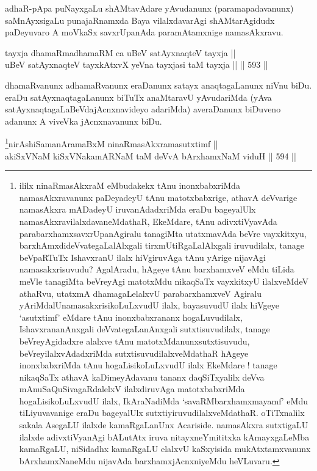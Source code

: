 \begin{artha}
adhaR-pApa puNayxgaLu shAMtavAdare yAvudanunx
(paramapadavanunx) saMnAyxsigaLu punajaRnamxda Baya vilalxdavarAgi
shAMtarAgidudx paDeyuvaro A moVkaSx savxrUpanAda paramAtamxnige
namasAkxravu.
\end{artha}


\begin{shl}
tayxja dhamaRmadhamaRM ca uBeV satAyxnaqteV tayxja || \\
uBeV satAyxnaqteV tayxkAtxvX yeVna tayxjasi taM tayxja ||  \hfill || 593 ||  
\end{shl}

\begin{artha}
dhamaRvanunx adhamaRvanunx eraDanunx satayx anaqtagaLanunx niVnu
biDu. eraDu satAyxnaqtagaLanunx biTuTx anaMtaravU yAvudariMda (yAva
satAyxnaqtagaLaBeVdajAcnxnavideyo adariMda) averaDanunx biDuveno
adanunx A viveVka jAcnxnavanunx biDu.
\end{artha}


\begin{shl}
\footnote{ililx ninaRmasAkxraM eMbudakekx tAnu inonxbabxriMda namasAkxravanunx paDeyadeyU tAnu matotxbabxrige, athavA deVvarige namasAkxra mADadeyU iruvanAdadxriMda eraDu bageyalUlx namasAkxravilalxdavaneMdathaR, EkeMdare, tAnu adivxtiVyavAda parabarxhamxsavxrUpanAgiralu tanagiMta utatxmavAda beVre vayxkitxyu, barxhAmxdideVvategaLalAlxgali tirxmUtiRgaLalAlxgali iruvudilalx, tanage beVpaRTuTx IshavxranU ilalx hiVgiruvAga tAnu yArige nijavAgi namasakxrisuvudu? AgalAradu, hAgeye tAnu barxhamxveV eMdu tiLida meVle tanagiMta beVreyAgi matotxMdu nikaqSaTx vayxkitxyU ilalxveMdeV athaRvu, utatxmA dhamagaLelalxvU parabarxhamxveV Agiralu yAriMdalU\break namasakxrisikoLuLxvudU ilalx, bayasuvudU ilalx hiVgeye `asutxtimf' eMdare tAnu inonxbabxrananx hogaLuvudilalx, IshavxrananAnxgali deVvategaLanAnxgali sutxtisuvudilalx, tanage beVreyAgidadxre alalxve tAnu matotxMdanunxsutxtisuvudu, beVreyilalxvAdadxriMda sutxtisuvudilalxveMdathaR hAgeye inonxbabxriMda tAnu hogaLisikoLuLxvudU ilalx EkeMdare ! tanage nikaqSaTx athavA kaDimeyAdavanu tananx daqSiTxyalilx deVva mAnuSaQuSivagaRdalelxV ilalxdiruvAga matotxbabxriMda hogaLisikoLuLxvudU ilalx, IkAraNadiMda `savaRMbarxhamxmayamf' eMdu tiLiyuvavanige eraDu bageyalUlx sutxtiyiruvudilalxveMdathaR. oTiTxnalilx sakala AsegaLU ilalxde kamaRgaLanUnx Acariside. namasAkxra sutxtigaLU ilalxde adivxtiVyanAgi bALutAtx iruva nitayxneYmititxka kAmayxgaLeMba kamaRgaLU, niSidadhx kamaRgaLU elalxvU kaSxyisida mukAtxtamxvanunx bArxhamxNaneMdu nijavAda barxhamxjAcnxniyeMdu heVLuvaru.}nirAshiSamanAramaBxM ninaRmasAkxramasutxtimf || \\
akiSxVNaM kiSxVNakamARNaM taM deVvA bArxhamxNaM viduH \hfill || 594 ||  
\end{shl}


